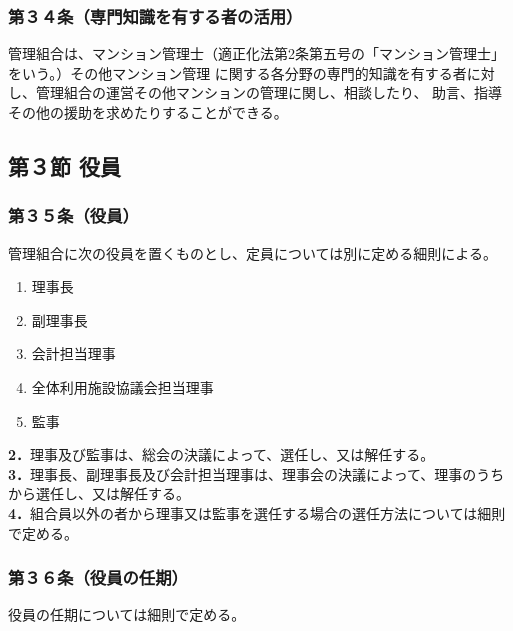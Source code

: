 \documentclass[
  luatex,
  paper=a4paper,
  fontsize=11pt,
  jafontsize=11pt,
  jlreq_notes,
]{jlreq}
\begin{document}
  \subsubsection*{第３４条（専門知識を有する者の活用）}
  管理組合は、マンション管理士（適正化法第2条第五号の「マンション管理士」をいう。）その他マンション管理
  に関する各分野の専門的知識を有する者に対し、管理組合の運営その他マンションの管理に関し、相談したり、
  助言、指導その他の援助を求めたりすることができる。
  
  \begin{center}
  \subsection*{第３節 役員}
  \end{center}
  \subsubsection*{第３５条（役員）}
  管理組合に次の役員を置くものとし、定員については別に定める細則による。
  \begin{enumerate}
  \item 理事長
  \item 副理事長
  \item 会計担当理事
  \item 全体利用施設協議会担当理事
  \item 監事
  \end{enumerate}
  \textbf{2．}理事及び監事は、総会の決議によって、選任し、又は解任する。\\
  \textbf{3．}理事長、副理事長及び会計担当理事は、理事会の決議によって、理事のうちから選任し、又は解任する。\\
  \textbf{4．}組合員以外の者から理事又は監事を選任する場合の選任方法については細則で定める。\\
  \subsubsection*{第３６条（役員の任期）}
  役員の任期については細則で定める。
\end{document}
